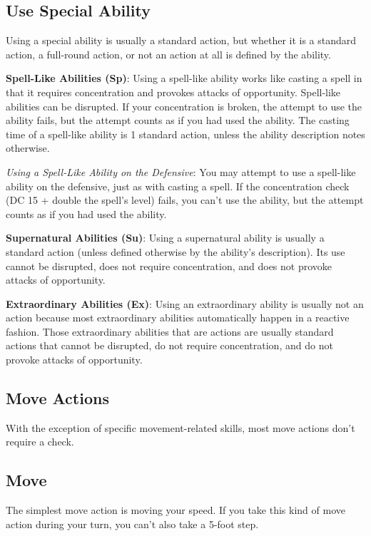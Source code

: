 \subsection{Use Special Ability}

				
Using a special ability is usually a standard action, but whether it is a standard action, a full-round action, or not an action at all is defined by the ability.
				
\textbf{Spell-Like Abilities (Sp)}: Using a spell-like ability works like casting a spell in that it requires concentration and provokes attacks of opportunity. Spell-like abilities can be disrupted. If your concentration is broken, the attempt to use the ability fails, but the attempt counts as if you had used the ability. The casting time of a spell-like ability is 1 standard action, unless the ability description notes otherwise.
				
\textit{Using a Spell-Like Ability on the Defensive}: You may attempt to use a spell-like ability on the defensive, just as with casting a spell. If the concentration check (DC 15 + double the spell's level) fails, you can't use the ability, but the attempt counts as if you had used the ability.
				
\textbf{Supernatural Abilities (Su)}: Using a supernatural ability is usually a standard action (unless defined otherwise by the ability's description). Its use cannot be disrupted, does not require concentration, and does not provoke attacks of opportunity.
				
\textbf{Extraordinary Abilities (Ex)}: Using an extraordinary ability is usually not an action because most extraordinary abilities automatically happen in a reactive fashion. Those extraordinary abilities that are actions are usually standard actions that cannot be disrupted, do not require concentration, and do not provoke attacks of opportunity.
				
\subsection{Move Actions}

				
With the exception of specific movement-related skills, most move actions don't require a check.
				
\subsection{Move}

				
The simplest move action is moving your speed. If you take this kind of move action during your turn, you can't also take a 5-foot step.
				
